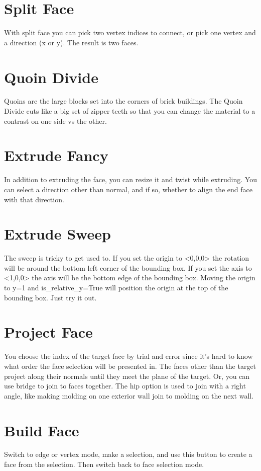 \documentclass[11pt]{article}
\begin{document}
    \section{Split Face}
    With split face you can pick two vertex indices to connect, or pick one vertex and a direction (x or y). The result
    is two faces.

    \section{Quoin Divide}
    Quoins are the large blocks set into the corners of brick buildings.
    The Quoin Divide cuts like a big set of zipper teeth so that you can change the material to a contrast on one side
    vs the other.

    \section{Extrude Fancy}
    In addition to extruding the face, you can resize it and twist while extruding.
    You can select a direction other than normal, and if so, whether to align the end face with that direction.

    \section{Extrude Sweep}
    The sweep is tricky to get used to.
    If you set the origin to <0,0,0> the rotation will be around the bottom left corner of the bounding box.
    If you set the axis to <1,0,0> the axis will be the bottom edge of the bounding box.
    Moving the origin to y=1 and is\_relative\_y=True will position the origin at the top of the bounding box.
    Just try it out.

    \section{Project Face}
    You choose the index of the target face by trial and error since it's hard to know what order the face selection
    will be presented in.
    The faces other than the target project along their normals until they meet the plane of the target.
    Or, you can use bridge to join to faces together.
    The hip option is used to join with a right angle, like making molding on one exterior wall join to molding on the
    next wall.

    \section{Build Face}
    Switch to edge or vertex mode, make a selection, and use this button to create a face from the selection.
    Then switch back to face selection mode.
\end{document}
